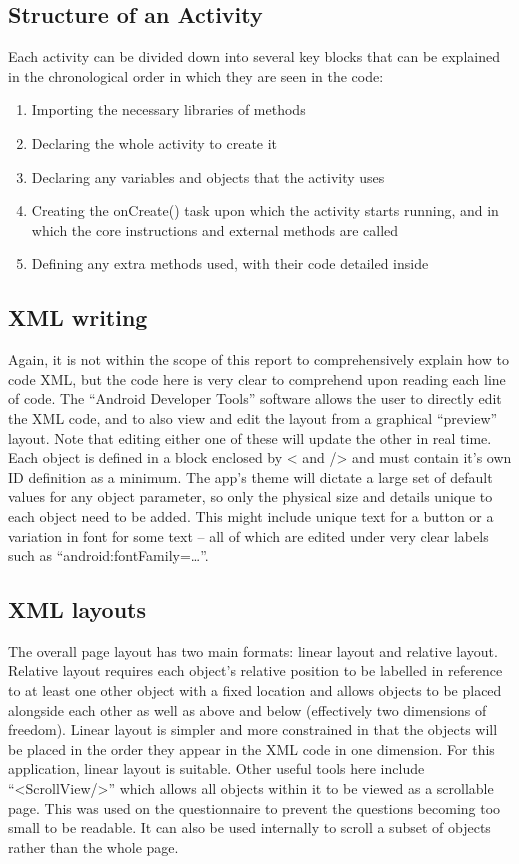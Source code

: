 \subsection{Structure of an Activity}
Each activity can be divided down into several key blocks that can be explained in the chronological order in which they are seen in the code:
\begin{enumerate}
\item Importing the necessary libraries of methods
\item Declaring the whole activity to create it
\item Declaring any variables and objects that the activity uses
\item Creating the onCreate() task upon which the activity starts running, and in which the core instructions and external methods are called
\item Defining any extra methods used, with their code detailed inside
\end{enumerate}
\subsection{XML writing}
Again, it is not within the scope of this report to comprehensively explain how to code XML, but the code here is very clear to comprehend upon reading each line of code. The “Android Developer Tools” software allows the user to directly edit the XML code, and to also view and edit the layout from a graphical “preview” layout. Note that editing either one of these will update the other in real time. Each object is defined in a block enclosed by < and /> and must contain it’s own ID definition as a minimum. The app’s theme will dictate a large set of default values for any object parameter, so only the physical size and details unique to each object need to be added. This might include unique text for a button or a variation in font for some text – all of which are edited under very clear labels such as “android:fontFamily=…”.
\subsection{XML layouts}
The overall page layout has two main formats: linear layout and relative layout. Relative layout requires each object’s relative position to be labelled in reference to at least one other object with a fixed location and allows objects to be placed alongside each other as well as above and below (effectively two dimensions of freedom). Linear layout is simpler and more constrained in that the objects will be placed in the order they appear in the XML code in one dimension. For this application, linear layout is suitable. Other useful tools here include “<ScrollView/>” which allows all objects within it to be viewed as a scrollable page. This was used on the questionnaire to prevent the questions becoming too small to be readable. It can also be used internally to scroll a subset of objects rather than the whole page.
